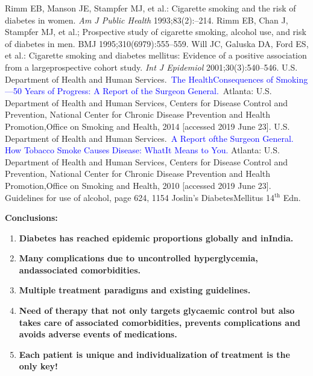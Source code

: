 \vspace{-\topsep}
\begin{thebibliography}{99}
\vspace{-\topsep}
\itemsep=0pt
 Rimm EB, Manson JE, Stampfer MJ, et al.: Cigarette smoking and the risk of diabetes in women. \textit{Am J Public Health} 1993;83(2):–214.
 Rimm EB, Chan J, Stampfer MJ, et al.; Prospective study of cigarette smoking, alcohol use, and risk of diabetes in men. BMJ 1995;310(6979):555–559.
 Will JC, Galuska DA, Ford ES, et al.: Cigarette smoking and dia\-betes mellitus: Evidence of a positive association from a large\break prospective cohort study. \textit{Int J Epidemiol} 2001;30(3):540–546.
 U.S. Department of Health and Human Services. \textcolor{blue}{The Health\break Consequences of Smoking—50 Years of Progress: A Report of the Surgeon General.} Atlanta: U.S. Department of Health and Human Services, Centers for Disease Control and Prevention, National Center for Chronic Disease Prevention and Health Promotion,\break Office on Smoking and Health, 2014 [accessed 2019 June 23].
 U.S. Department of Health and Human Services. \textcolor{blue}{A Report of\break the Surgeon General. How Tobacco Smoke Causes Disease: What\break It Means to You.} Atlanta: U.S. Department of Health and Human Services, Centers for Disease Control and Prevention, National Center for Chronic Disease Prevention and Health Promotion,\break Office on Smoking and Health, 2010 [accessed 2019 June 23].
 Guidelines for use of alcohol, page 624, 1154 Joslin’s Diabetes\break Mellitus 14$^{\text{th}}$ Edn.
\end{thebibliography}

\noindent\textbf{Conclusions:}

\vspace{-\topsep}
\begin{enumerate}[•]
\itemsep=0pt
\item \textbf{Diabetes has reached epidemic proportions globally and in\break India.}
\item \textbf{Many complications due to uncontrolled hyperglycemia, and\break asso\-ciated comorbidities.}
\item \textbf{Multiple treatment paradigms and existing guidelines.}
\item \textbf{Need of therapy that not only targets glycaemic control but also takes care of associated comorbidities, prevents complications and avoids adverse events of medications.}
\item \textbf{Each patient is unique and individualization of treatment is the only key!}
\end{enumerate}

